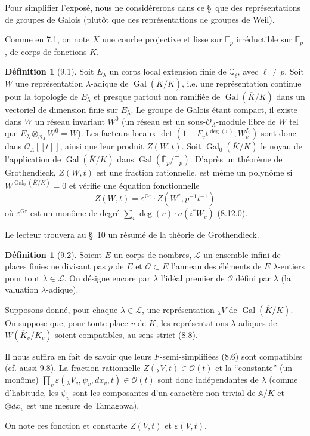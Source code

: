 \documentclass[11pt]{amsart}
\theoremstyle{plain}
\theoremstyle{definition}
\newtheorem{definition}[theorem]{D\'efinition}
\DeclareMathOperator{\Gal}{Gal}
\begin{document}
Pour simplifier l'expos\'e, nous ne consid\'ererons dans ce \S\ que des repr\'esentations de groupes de Galois (plut\^ot que des repr\'esentations de groupes de Weil).

Comme en 7.1, on note $X$ une courbe projective et lisse sur $\mathbb{F}_p$ irr\'eductible sur $\mathbb{F}_p$, de corps de fonctions $K$.

\begin{definition}[9.1]
Soit $E_\lambda$ un corps local extension finie de $\mathbb{Q}_\ell$, avec $\ell \not= p$. Soit $W$ une repr\'esentation $\lambda$-adique de $\Gal(\overline{K}/K)$, i.e. une repr\'esentation continue pour la topologie de $E_\lambda$ et presque partout non ramifi\'ee de $\Gal(\overline{K}/K)$ dans un vectoriel de dimension finie sur $E_\lambda$. Le groupe de Galois \'etant compact, il existe dans $W$ un r\'eseau invariant $W^0$ (un r\'eseau est un sous-$\mathcal{O}_\Lambda$-module libre de $W$ tel que $E_\lambda \otimes_{\mathcal{O}_\Lambda} W^0 = W$). Les facteurs locaux $\det(1 - F_v t^{\deg(v)}, W_v^{I_v})$ sont donc dans $\mathcal{O}_\Lambda[[t]]$, ainsi que leur produit $Z(W,t)$. Soit $\Gal_0(\overline{K}/K)$ le noyau de l'application de $\Gal(\overline{K}/K)$ dans $\Gal(\overline{\mathbb{F}}_p/\mathbb{F}_p)$. D'apr\`es un th\'eor\`eme de Grothendieck, $Z(W,t)$ est une fraction rationnelle, est m\^eme un polyn\^ome si $W^{\Gal_0(\overline{K}/K)} = 0$ et v\'erifie une \'equation fonctionnelle
\begin{equation}
Z(W,t) = \varepsilon^{\mathrm{Gr}} \cdot Z(W^*, p^{-1}t^{-1})
\tag{9.1.0}
\end{equation}
o\`u $\varepsilon^{\mathrm{Gr}}$ est un mon\^ome de degr\'e $\sum_v \deg(v) \cdot a(i^*W_v)$ (8.12.0).

Le lecteur trouvera au \S\ 10 un r\'esum\'e de la th\'eorie de Grothendieck.
\end{definition}

\begin{definition}[9.2]
Soient $E$ un corps de nombres, $\mathcal{L}$ un ensemble infini de places finies ne divisant pas $p$ de $E$ et $\mathcal{O} \subset E$ l'anneau des \'el\'ements de $E$ $\lambda$-entiers pour tout $\lambda \in \mathcal{L}$. On d\'esigne encore par $\lambda$ l'id\'eal premier de $\mathcal{O}$ d\'efini par $\lambda$ (la valuation $\lambda$-adique).

Supposons donn\'e, pour chaque $\lambda \in \mathcal{L}$, une repr\'esentation $_\lambda V$ de $\Gal(\overline{K}/K)$. On suppose que, pour toute place $v$ de $K$, les repr\'esentations $\lambda$-adiques de $W(\overline{K}_v/K_v)$ soient compatibles, au sens strict (8.8).

Il nous suffira en fait de savoir que leurs $F$-semi-simplifi\'ees (8.6) sont compatibles (cf. aussi 9.8). La fraction rationnelle $Z(_\lambda V,t) \in \mathcal{O}(t)$ et la ``constante'' (un mon\^ome) $\prod_v \varepsilon(_\lambda V_v,\psi_v,dx_v,t) \in \mathcal{O}(t)$ sont donc ind\'ependantes de $\lambda$ (comme d'habitude, les $\psi_v$ sont les composantes d'un caract\`ere non trivial de $\mathbb{A}/K$ et $\otimes dx_v$ est une mesure de Tamagawa).

On note ces fonction et constante $Z(V,t)$ et $\varepsilon(V,t)$.
\end{definition}
\end{document}

